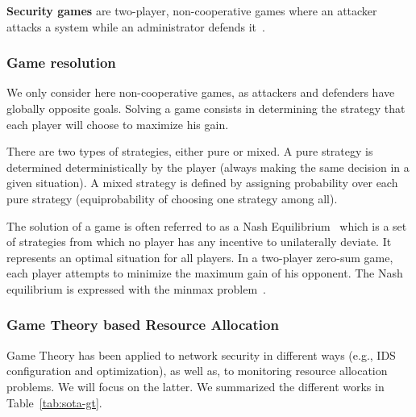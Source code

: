 \textbf{Security games} are two-player, non-cooperative games where an attacker attacks a system while an administrator defends it~\cite{book-gt}.

\subsubsection{Game resolution}
We only consider here non-cooperative games, as attackers and defenders have globally opposite goals.
Solving a game consists in determining the strategy that each player will choose to maximize his gain.

There are two types of strategies, either pure or mixed.
A pure strategy is determined deterministically by the player (\ie always making the same decision in a given situation).
A mixed strategy is defined by assigning probability over each pure strategy (\eg equiprobability of choosing one strategy among all).

The solution of a game is often referred to as a Nash Equilibrium~\cite{nasheq} which is a set of strategies from which no player has any incentive to unilaterally deviate. It represents an optimal situation for all players.
In a two-player zero-sum game, each player attempts to minimize the maximum gain of his opponent. 
The Nash equilibrium is expressed with the minmax problem~\cite{minmax}.

\subsubsection{Game Theory based Resource Allocation}
Game Theory has been applied to network security in different ways (e.g., IDS configuration and optimization), as well as, to monitoring resource allocation problems. We will focus on the latter. We summarized the different works in Table~\ref{tab:sota-gt}.

